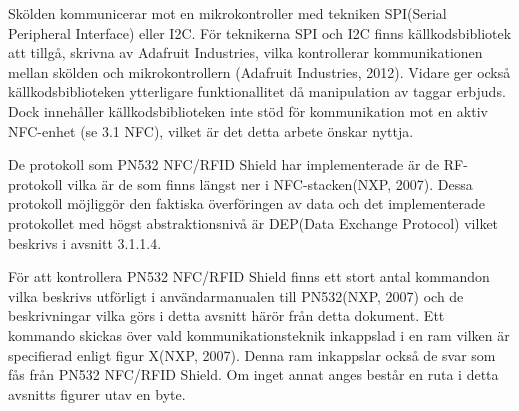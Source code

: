\documentclass[11pt]{article}
\begin{document}

Skölden kommunicerar mot en mikrokontroller med tekniken SPI(Serial Peripheral Interface) eller I2C. För teknikerna SPI och I2C finns källkodsbibliotek att tillgå, skrivna av Adafruit Industries, vilka kontrollerar kommunikationen mellan skölden och mikrokontrollern (Adafruit Industries, 2012). Vidare ger också källkodsbiblioteken ytterligare funktionallitet då manipulation av taggar erbjuds. Dock innehåller källkodsbiblioteken inte stöd för kommunikation mot en aktiv NFC-enhet (se 3.1 NFC), vilket är det detta arbete önskar nyttja.

De protokoll som PN532 NFC/RFID Shield har implementerade är de RF-protokoll vilka är de som finns längst ner i NFC-stacken(NXP, 2007). Dessa protokoll möjliggör den faktiska överföringen av data och det implementerade protokollet med högst abstraktionsnivå är DEP(Data Exchange Protocol) vilket beskrivs i avsnitt 3.1.1.4.

För att kontrollera PN532 NFC/RFID Shield finns ett stort antal kommandon vilka beskrivs utförligt i användarmanualen till PN532(NXP, 2007) och de beskrivningar vilka görs i detta avsnitt härör från detta dokument. Ett kommando skickas över vald kommunikationsteknik inkappslad i en ram vilken är specifierad enligt figur X(NXP, 2007). Denna ram inkappslar också de svar som fås från PN532 NFC/RFID Shield. Om inget annat anges består en ruta i detta avsnitts figurer utav en byte.

\end{document}

